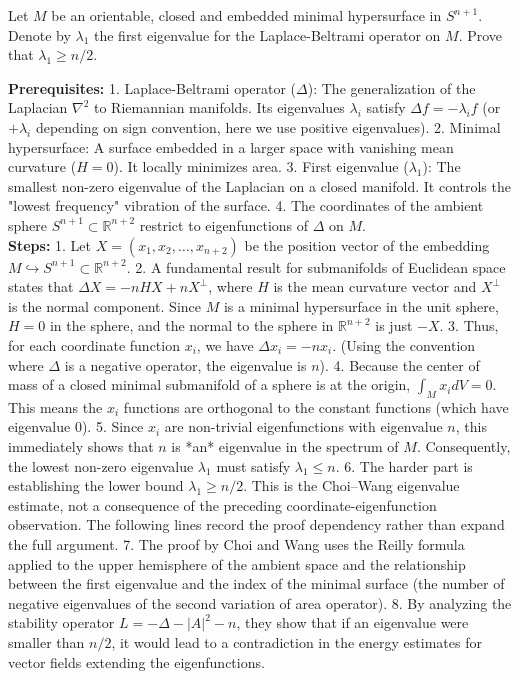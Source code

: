 \begin{exercise}
\label{geometry:2016:6}
Let $M$ be an orientable, closed and embedded minimal hypersurface in $S^{n+1}$. Denote by $\lambda_{1}$ the first eigenvalue for the Laplace-Beltrami operator on $M$. Prove that $\lambda_{1} \geq n/2$.
\end{exercise}

\begin{solution}
\textbf{Prerequisites:}
1. Laplace-Beltrami operator ($\Delta$): The generalization of the Laplacian $\nabla^2$ to Riemannian manifolds. Its eigenvalues $\lambda_i$ satisfy $\Delta f = -\lambda_i f$ (or $+\lambda_i$ depending on sign convention, here we use positive eigenvalues).
2. Minimal hypersurface: A surface embedded in a larger space with vanishing mean curvature ($H=0$). It locally minimizes area.
3. First eigenvalue ($\lambda_1$): The smallest non-zero eigenvalue of the Laplacian on a closed manifold. It controls the "lowest frequency" vibration of the surface.
4. The coordinates of the ambient sphere $S^{n+1} \subset \mathbb{R}^{n+2}$ restrict to eigenfunctions of $\Delta$ on $M$.\\[2ex]

\textbf{Steps:}
1. Let $X = (x_1, x_2, \dots, x_{n+2})$ be the position vector of the embedding $M \hookrightarrow S^{n+1} \subset \mathbb{R}^{n+2}$.
2. A fundamental result for submanifolds of Euclidean space states that $\Delta X = -nH X + n X^\perp$, where $H$ is the mean curvature vector and $X^\perp$ is the normal component. Since $M$ is a minimal hypersurface in the unit sphere, $H = 0$ in the sphere, and the normal to the sphere in $\mathbb{R}^{n+2}$ is just $-X$.
3. Thus, for each coordinate function $x_i$, we have $\Delta x_i = -n x_i$. (Using the convention where $\Delta$ is a negative operator, the eigenvalue is $n$).
4. Because the center of mass of a closed minimal submanifold of a sphere is at the origin, $\int_M x_i dV = 0$. This means the $x_i$ functions are orthogonal to the constant functions (which have eigenvalue 0).
5. Since $x_i$ are non-trivial eigenfunctions with eigenvalue $n$, this immediately shows that $n$ is *an* eigenvalue in the spectrum of $M$. Consequently, the lowest non-zero eigenvalue $\lambda_1$ must satisfy $\lambda_1 \le n$.
6. The harder part is establishing the lower bound $\lambda_1 \ge n/2$. This is the Choi--Wang eigenvalue estimate, not a consequence of the preceding coordinate-eigenfunction observation. The following lines record the proof dependency rather than expand the full argument.
7. The proof by Choi and Wang uses the Reilly formula applied to the upper hemisphere of the ambient space and the relationship between the first eigenvalue and the index of the minimal surface (the number of negative eigenvalues of the second variation of area operator).
8. By analyzing the stability operator $L = -\Delta - |A|^2 - n$, they show that if an eigenvalue were smaller than $n/2$, it would lead to a contradiction in the energy estimates for vector fields extending the eigenfunctions.\\[2ex]


\end{solution}
